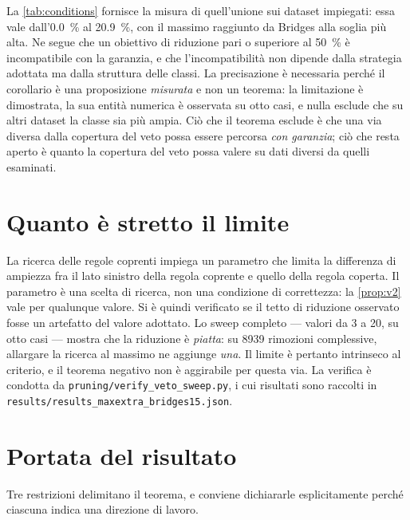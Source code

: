 La \autoref{tab:conditions} fornisce la misura di quell'unione sui dataset impiegati: essa vale
dall'\SI{0.0}{\percent} al \SI{20.9}{\percent}, con il massimo raggiunto da Bridges alla soglia più
alta. Ne segue che un obiettivo di riduzione pari o superiore al \SI{50}{\percent} è incompatibile
con la garanzia, e che l'incompatibilità non dipende dalla strategia adottata ma dalla struttura
delle classi. La precisazione è necessaria perché il corollario è una proposizione \emph{misurata}
e non un teorema: la limitazione è dimostrata, la sua entità numerica è osservata su otto casi, e
nulla esclude che su altri dataset la classe \Vtwo{} sia più ampia. Ciò che il teorema esclude è
che una via diversa dalla copertura del veto possa essere percorsa \emph{con garanzia}; ciò che
resta aperto è quanto la copertura del veto possa valere su dati diversi da quelli esaminati.

\section{Quanto è stretto il limite}\label{sec:maxextra}

La ricerca delle regole coprenti impiega un parametro che limita la differenza di ampiezza fra il
lato sinistro della regola coprente e quello della regola coperta. Il parametro è una scelta di
ricerca, non una condizione di correttezza: la \autoref{prop:v2} vale per qualunque valore. Si è
quindi verificato se il tetto di riduzione osservato fosse un artefatto del valore adottato. Lo
sweep completo --- valori da 3 a 20, su otto casi --- mostra che la riduzione è \emph{piatta}: su
\num{8939} rimozioni complessive, allargare la ricerca al massimo ne aggiunge \emph{una}. Il limite
è pertanto intrinseco al criterio, e il teorema negativo non è aggirabile per questa via. La
verifica è condotta da \texttt{pruning/verify\_veto\_sweep.py}, i cui risultati sono raccolti in
\texttt{results/results\_maxextra\_bridges15.json}.

\section{Portata del risultato}\label{sec:theory-scope}

Tre restrizioni delimitano il teorema, e conviene dichiararle esplicitamente perché ciascuna
indica una direzione di lavoro.

